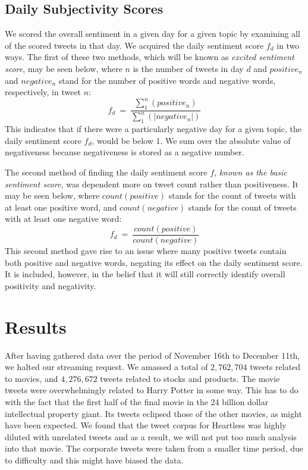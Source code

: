 \documentclass[11pt]{article}
\begin{document}
\subsection{Daily Subjectivity Scores}
We scored the overall sentiment in a given day for a given topic by examining all of the scored tweets in that day. We acquired the daily sentiment score $f_{d}$ in two ways. The first of these two methods, which will be known as \textit{excited sentiment score}, may be seen below, where $n$ is the number of tweets in day $d$ and $positive_{n}$ and $negative_{n}$ stand for the number of positive words and negative words, respectively, in tweet $n$:
\begin{equation}
f_{d}\ =\ \frac{\sum_{1}^{n}(positive_{n})}{\sum_{1}^{n}(|negative_{n}|)}
\end{equation}
This indicates that if there were a particularly negative day for a given topic, the daily sentiment score $f_{d}$, would be below 1. We sum over the absolute value of negativeness because negativeness is stored as a negative number.

The second method of finding the daily sentiment score $f$, \textit{known as the basic sentiment score}, was dependent more on tweet count rather than positiveness. It may be seen below, where $count(positive)$ stands for the count of tweets with at least one positive word, and $count(negative)$ stands for the count of tweets with at least one negative word:
\begin{equation}
f_{d}\ =\ \frac{count(positive)}{count(negative)}
\end{equation}
This second method gave rise to an issue where many positive tweets contain both positive and negative words, negating its effect on the daily sentiment score. It is included, however, in the belief that it will still correctly identify overall positivity and negativity.


\section{Results}
After having gathered data over the period of November 16th to December 11th, we halted our streaming request. We amassed a total of $2,762,704$ tweets related to movies, and $4,276,672$ tweets related to stocks and products. The movie tweets were overwhelmingly related to Harry Potter in some way. This has to do with the fact that the first half of the final movie in the 24 billion dollar intellectual property giant. Its tweets eclipsed those of the other movies, as might have been expected. We found that the tweet corpus for Heartless was highly diluted with unrelated tweets and as a result, we will not put too much analysis into that movie. The corporate tweets were taken from a smaller time period, due to difficulty and this might have biased the data.
\end{document}
